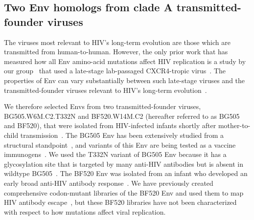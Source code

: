 \documentclass[9pt]{elife}
\begin{document}
\subsection*{Two Env homologs from clade A transmitted-founder viruses}
The viruses most relevant to HIV's long-term evolution are those which are transmitted from human-to-human.
However, the only prior work that has measured how all Env amino-acid mutations affect HIV replication is a study by our group~\citep{haddox2016experimental} that used a late-stage lab-passaged CXCR4-tropic virus~\citep[LAI;][]{peden1991changes}.
The properties of Env can vary substantially between such late-stage viruses and the transmitted-founder viruses relevant to HIV's long-term evolution~\citep{sagar2006human,wilen2011phenotypic,parrish2013phenotypic}.

We therefore selected Envs from two transmitted-founder viruses, BG505.W6M.C2.T332N and BF520.W14M.C2 (hereafter referred to as BG505 and BF520), that were isolated from HIV-infected infants shortly after mother-to-child transmission~\citep{goo2014early}.
The BG505 Env has been extensively studied from a structural standpoint~\citep{julien2013crystal,lyumkis2013cryo,pancera2014structure,huang2014broad,sanders2015hiv,stewart2016trimeric}, and variants of this Env are being tested as a vaccine immunogens~\citep{sanders2013next,sanders2015hiv,de2015immunogenicity}.
We used the T332N variant of BG505 Env because it has a glycosylation site that is targeted by many anti-HIV antibodies but is absent in wildtype BG505~\citep{sanders2013next}.
The BF520 Env was isolated from an infant who developed an early broad anti-HIV antibody response~\citep{goo2014early,simonich2016hiv}.
We have previously created comprehensive codon-mutant libraries of the BF520 Env and used them to map HIV antibody escape~\citep{dingens2017comprehensive}, but these BF520 libraries have not been characterized with respect to how mutations affect viral replication.
\end{document}
